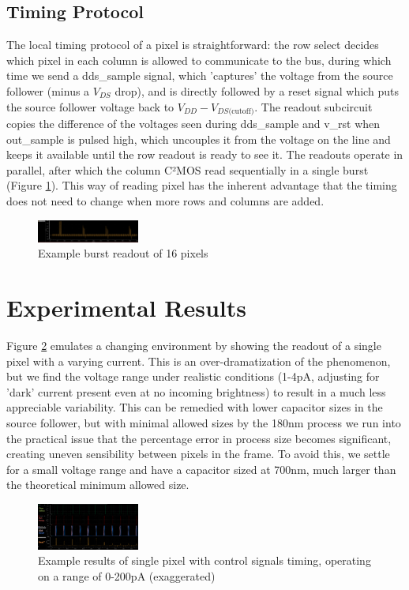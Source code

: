 \documentclass[lettersize,journal]{IEEEtran}
\begin{document}
\subsection{Timing Protocol}
The local timing protocol of a pixel is straightforward: the row select decides which pixel in each column is allowed to communicate to the bus, during which time we send a dds\_sample signal, 
which 'captures' the voltage from the source follower (minus a $V_{DS}$ drop),
and is directly followed by a reset signal which puts the source follower voltage back to $V_{DD}-V_{DS\text{(cutoff)}}$.
The readout subcircuit copies the difference of the voltages seen during dds\_sample and v\_rst when out\_sample is pulsed high, which uncouples it from the voltage on the line and keeps it available until the row readout is ready to see it.
The readouts operate in parallel, after which the column C²MOS read sequentially in a single burst (Figure \ref{burstreadout}).
This way of reading pixel has the inherent advantage that the timing does not need to change when more rows and columns are added.
\begin{figure}[h]
	\centering
	\includegraphics[width = 0.3\textwidth]{burstreadout.png}
	\caption{Example burst readout of 16 pixels}
	\label{burstreadout}
\end{figure}

\section{Experimental Results}

Figure \ref{exaggerated} emulates a changing environment by showing the readout of a single pixel with a varying current.
This is an over-dramatization of the phenomenon, but we find the voltage range under realistic conditions (1-4pA, adjusting for 'dark' current present even at no incoming brightness) to result in a much less appreciable variability.
This can be remedied with lower capacitor sizes in the source follower, but with minimal allowed sizes by the 180nm process we run into the practical issue that the percentage error in process size becomes significant, creating uneven sensibility between pixels in the frame.
To avoid this, we settle for a small voltage range and have a capacitor sized at 700nm, much larger than the theoretical minimum allowed size.
\begin{figure}[h]
	\centering
	\includegraphics[width =0.3\textwidth]{exaggerated.png}
	\caption{Example results of single pixel with control signals timing, operating on a range of 0-200pA (exaggerated)}
	\label{exaggerated}
\end{figure}
\end{document}
